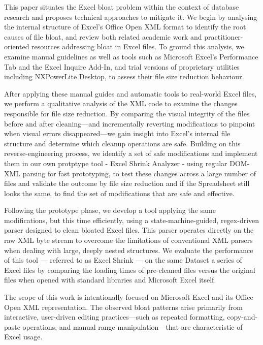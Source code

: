 \documentclass[conference]{IEEEtran}
\begin{document}
This paper situates the Excel bloat problem within the context of database research
and proposes technical approaches to mitigate it.
We begin by analysing the internal structure of Excel's Office Open XML format
to identify the root causes of file bloat,
and review both related academic work and practitioner-oriented resources
addressing bloat in Excel files.
To ground this analysis, we examine manual guidelines as well as tools such as
Microsoft Excel’s Performance Tab and the Excel Inquire Add-In,
and trial versions of proprietary utilities including NXPowerLite Desktop,
to assess their file size reduction behaviour.



After applying these manual guides and automatic tools to real-world Excel files, we perform a qualitative analysis of the XML code to examine the changes responsible for file size reduction. By comparing the visual integrity of the files before and after cleaning—and incrementally reverting modifications to pinpoint when visual errors disappeared—we gain insight into Excel's internal file structure and determine which cleanup operations are safe. Building on this reverse-engineering process, we identify a set of safe modifications and implement them in our own protptype tool - Excel Shrink Analyzer \cite{Johr2026ExcelShrinkAnalyzer} - using regular DOM-XML parsing for fast prototyping, to test these changes across a large number of files and validate the outcome by file size reduction and if the Spreadsheet still looks the same, to find the set of modifications that are safe and effective.

Following the prototype phase, we develop a tool applying the same modifications, but this time efficiently, using a state-machine-guided, regex-driven parser designed to clean bloated Excel files. This parser operates directly on the raw XML byte stream to overcome the limitations of conventional XML parsers when dealing with large, deeply nested structures. We evaluate the performance of this tool — referred to as Excel Shrink \cite{Johr2026ExcelShrink} — on the same Dataset a series of Excel files by comparing the loading times of pre-cleaned files versus the original files when opened with standard libraries and Microsoft Excel itself.

The scope of this work is intentionally focused on Microsoft Excel
and its Office Open XML representation.
The observed bloat patterns arise primarily from interactive, user-driven editing
practices—such as repeated formatting, copy-and-paste operations,
and manual range manipulation—that are characteristic of Excel usage.
\end{document}
